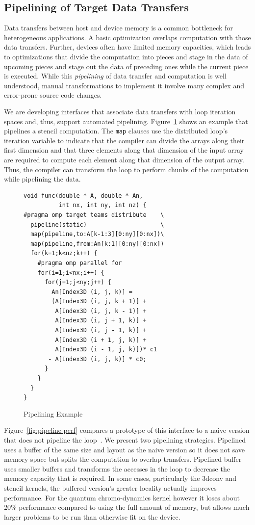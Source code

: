 \subsection{Pipelining of Target Data Transfers}
\label{sub:pipelining}

Data transfers between host and device memory is a common bottleneck 
for heterogeneous applications. A basic optimization overlaps computation
with those data transfers. Further, devices often have limited memory 
capacities, which leads to optimizations that divide the computation
into pieces and stage in the data of upcoming pieces and stage out the
data of preceding ones while the current piece is executed. While this
\emph{pipelining} of data transfer and computation is well understood,
manual transformations to implement it involve many complex
and error-prone source code changes. 

We are developing interfaces that associate data transfers with loop iteration 
spaces and, thus, support automated pipelining. Figure~\ref{fig:pipeline} shows
an example that pipelines a stencil computation. The \texttt{map} clauses use 
the distributed loop's iteration variable to indicate that the compiler 
can divide the arrays along their first dimension and that three elements 
along that dimension of the input array are required to compute each element 
along that dimension of the output array. Thus, the compiler can transform 
the loop to perform chunks of the computation while pipelining the data.

\begin{figure}
\begin{verbatim}
void func(double * A, double * An,
          int nx, int ny, int nz) {
#pragma omp target teams distribute    \
  pipeline(static)                     \
  map(pipeline,to:A[k-1:3][0:ny][0:nx])\
  map(pipeline,from:An[k:1][0:ny][0:nx])
  for(k=1;k<nz;k++) {
    #pragma omp parallel for
    for(i=1;i<nx;i++) {
      for(j=1;j<ny;j++) {
        An[Index3D (i, j, k)] =
        (A[Index3D (i, j, k + 1)] +
         A[Index3D (i, j, k - 1)] +
         A[Index3D (i, j + 1, k)] +
         A[Index3D (i, j - 1, k)] +
         A[Index3D (i + 1, j, k)] +
         A[Index3D (i - 1, j, k)])* c1
       - A[Index3D (i, j, k)] * c0;
      }
    } 
  }
}
\end{verbatim}
\caption{Pipelining Example\label{fig:pipeline}}
\end{figure}

Figure~\ref{fig:pipeline-perf} compares a prototype of this interface to a 
naive version that does not pipeline the loop~\cite{cui2017directive}. We 
present two pipelining strategies. Pipelined uses a buffer of the same size 
and layout as the naive version so it does not save memory space but splits 
the computation to overlap transfers. Pipelined-buffer uses smaller buffers
and transforms the accesses in the loop to decrease the memory capacity that
is required. In some cases, particularly the 3dconv and stencil kernels, the 
buffered version's greater locality actually improves performance. For the 
quantum chromo-dynamics kernel however it loses about 20\% performance 
compared to using the full amount of memory, but allows much larger 
problems to be run than otherwise fit on the device.

